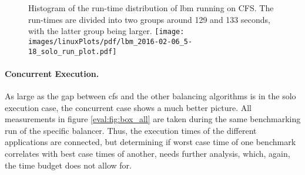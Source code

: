 \begin{figure}[!ht]
  \setcapindent*{1em}
  \begin{captionbeside}[]{Histogram of the run-time distribution of lbm running
    on CFS. The run-times are divided into two groups around 129 and 133
    seconds, with the latter group being larger.}
    \texttt{[image: images/linuxPlots/pdf/lbm\_2016-02-06\_5-18\_solo\_run\_plot.pdf]}
  \end{captionbeside}
  \label{eval:fig:lbm_cfs_solo}
\end{figure}



\begin{comment}
\begin{figure}[ht!]
  \begin{subfigure}{.49\textwidth}
    \texttt{[image: images/finalPlots/barcharts/barchart\_solo\_gcc]}
    \caption{SPEC GCC}
    \label{solo:gcc}
  \end{subfigure}
  \begin{subfigure}{.49\textwidth}
    \texttt{[image: images/finalPlots/barcharts/barchart\_solo\_gamess]}
    \caption{SPEC GAMESS}
    \label{solo:gamess}
  \end{subfigure}
  \begin{subfigure}{.49\textwidth}
    \texttt{[image: images/finalPlots/barcharts/barchart\_solo\_lbm]}
    \caption{SPEC LBM}
    \label{solo:lbm}
  \end{subfigure}
  \begin{subfigure}{.49\textwidth}
    \texttt{[image: images/finalPlots/barcharts/barchart\_solo\_mcf]}
    \caption{SPEC MCF}
    \label{solo:mcf}
  \end{subfigure}
  \caption{Solo run-times for each SPEC benchmark and each load balancer.
    Shown is the median over 100 repetitions together with minimum and maximum
    run-time.}
\end{figure}
\end{comment}

\paragraph{Concurrent Execution.}
As large as the gap between \gls{cfs} and the other balancing algorithms is in
the solo execution case, the concurrent case shows a much better picture.
All measurements in figure \ref{eval:fig:box_all} are taken during the same
benchmarking run of the specific balancer.
Thus, the execution times of the different applications are connected, but
determining if worst case time of
one benchmark correlates with best case times of another, needs further
analysis, which, again, the time budget does not allow for.

